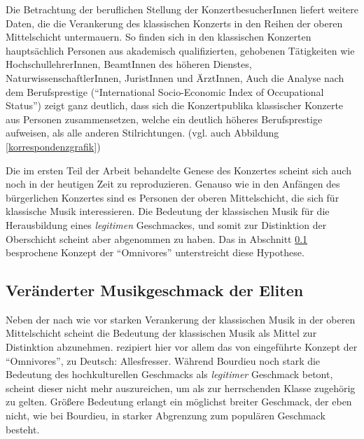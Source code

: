 \documentclass[a4paper, german, oneside]{scrbook}
\begin{document}
Die Betrachtung der beruflichen Stellung der KonzertbesucherInnen liefert weitere Daten, die die Verankerung des klassischen Konzerts in den Reihen der oberen Mittelschicht untermauern. So finden sich in den klassischen Konzerten hauptsächlich Personen aus akademisch qualifizierten, gehobenen Tätigkeiten wie HochschullehrerInnen, BeamtInnen des höheren Dienstes, NaturwissenschaftlerInnen, JuristInnen und ÄrztInnen,  Auch die Analyse nach dem Berufsprestige (\enquote{International Socio-Economic Index of Occupational Status}) zeigt ganz deutlich, dass sich die Konzertpublika klassischer Konzerte aus Personen zusammensetzen, welche ein deutlich höheres Berufsprestige aufweisen, als alle anderen Stilrichtungen. (vgl. auch Abbildung \ref{korrespondenzgrafik})



Die im ersten Teil der Arbeit behandelte Genese des Konzertes scheint sich auch noch in der heutigen Zeit zu reproduzieren. Genauso wie in den Anfängen des bürgerlichen Konzertes sind es Personen der oberen Mittelschicht, die sich für klassische Musik interessieren. Die Bedeutung der klassischen Musik für die Herausbildung eines \emph{legitimen} Geschmackes, und somit zur Distinktion der Oberschicht scheint aber abgenommen zu haben. Das in Abschnitt \ref{ominvores} besprochene Konzept der \enquote{Omnivores} unterstreicht diese Hypothese.

\subsection{Veränderter Musikgeschmack der Eliten}
\label{ominvores}
Neben der nach wie vor starken Verankerung der klassischen Musik in der oberen Mittelschicht scheint die Bedeutung der klassischen Musik als Mittel zur Distinktion abzunehmen. \textcite{gebesmair_grundzuge_2001} rezipiert hier vor allem das von \textcite{peterson_understanding_1992} eingeführte Konzept der \enquote{Omnivores}, zu Deutsch: Allesfresser. Während Bourdieu noch stark die Bedeutung des hochkulturellen Geschmacks als \emph{legitimer} Geschmack betont, scheint dieser nicht mehr auszureichen, um als zur herrschenden Klasse zugehörig zu gelten. Größere Bedeutung erlangt ein möglichst breiter Geschmack, der eben nicht, wie bei Bourdieu, in starker Abgrenzung zum populären Geschmack besteht. 
\end{document}
